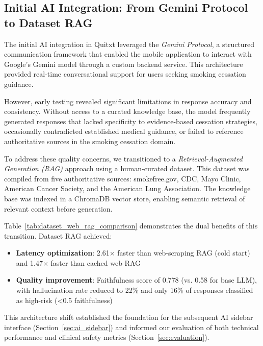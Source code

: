 
\subsection{Initial AI Integration: From Gemini Protocol to Dataset RAG}

The initial AI integration in Quitxt leveraged the \textit{Gemini Protocol}, a structured communication framework that enabled the mobile application to interact with Google's Gemini model through a custom backend service. This architecture provided real-time conversational support for users seeking smoking cessation guidance.

However, early testing revealed significant limitations in response accuracy and consistency. Without access to a curated knowledge base, the model frequently generated responses that lacked specificity to evidence-based cessation strategies, occasionally contradicted established medical guidance, or failed to reference authoritative sources in the smoking cessation domain.

To address these quality concerns, we transitioned to a \textit{Retrieval-Augmented Generation (RAG)} approach using a human-curated dataset. This dataset was compiled from five authoritative sources: smokefree.gov, CDC, Mayo Clinic, American Cancer Society, and the American Lung Association. The knowledge base was indexed in a ChromaDB vector store, enabling semantic retrieval of relevant context before generation.

Table~\ref{tab:dataset_web_rag_comparison} demonstrates the dual benefits of this transition. Dataset RAG achieved:
\begin{itemize}
    \item \textbf{Latency optimization}: 2.61× faster than web-scraping RAG (cold start) and 1.47× faster than cached web RAG
    \item \textbf{Quality improvement}: Faithfulness score of 0.778 (vs. 0.58 for base LLM), with hallucination rate reduced to 22\% and only 16\% of responses classified as high-risk (<0.5 faithfulness)
\end{itemize}

This architecture shift established the foundation for the subsequent AI sidebar interface (Section~\ref{sec:ai_sidebar}) and informed our evaluation of both technical performance and clinical safety metrics (Section~\ref{sec:evaluation}).
